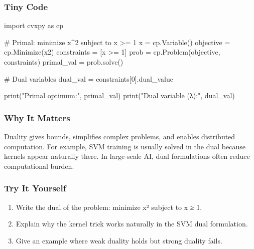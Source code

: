 \documentclass[
  letterpaper,
  DIV=11,
  numbers=noendperiod]{scrreprt}
\newenvironment{Shaded}{\begin{snugshade}}{\end{snugshade}}
\newcommand{\BuiltInTok}[1]{\textcolor[rgb]{0.00,0.23,0.31}{#1}}
\newcommand{\CommentTok}[1]{\textcolor[rgb]{0.37,0.37,0.37}{#1}}
\newcommand{\DecValTok}[1]{\textcolor[rgb]{0.68,0.00,0.00}{#1}}
\newcommand{\ImportTok}[1]{\textcolor[rgb]{0.00,0.46,0.62}{#1}}
\newcommand{\NormalTok}[1]{\textcolor[rgb]{0.00,0.23,0.31}{#1}}
\newcommand{\OperatorTok}[1]{\textcolor[rgb]{0.37,0.37,0.37}{#1}}
\newcommand{\StringTok}[1]{\textcolor[rgb]{0.13,0.47,0.30}{#1}}
\providecommand{\tightlist}{%
  \setlength{\itemsep}{0pt}\setlength{\parskip}{0pt}}
\begin{document}
\subsubsection{Tiny Code}\label{tiny-code-144}

\begin{Shaded}
\begin{Highlighting}[]
\ImportTok{import}\NormalTok{ cvxpy }\ImportTok{as}\NormalTok{ cp}

\CommentTok{\# Primal: minimize x\^{}2 subject to x \textgreater{}= 1}
\NormalTok{x }\OperatorTok{=}\NormalTok{ cp.Variable()}
\NormalTok{objective }\OperatorTok{=}\NormalTok{ cp.Minimize(x2)}
\NormalTok{constraints }\OperatorTok{=}\NormalTok{ [x }\OperatorTok{\textgreater{}=} \DecValTok{1}\NormalTok{]}
\NormalTok{prob }\OperatorTok{=}\NormalTok{ cp.Problem(objective, constraints)}
\NormalTok{primal\_val }\OperatorTok{=}\NormalTok{ prob.solve()}

\CommentTok{\# Dual variables}
\NormalTok{dual\_val }\OperatorTok{=}\NormalTok{ constraints[}\DecValTok{0}\NormalTok{].dual\_value}

\BuiltInTok{print}\NormalTok{(}\StringTok{"Primal optimum:"}\NormalTok{, primal\_val)}
\BuiltInTok{print}\NormalTok{(}\StringTok{"Dual variable (λ):"}\NormalTok{, dual\_val)}
\end{Highlighting}
\end{Shaded}

\subsubsection{Why It Matters}\label{why-it-matters-42}

Duality gives bounds, simplifies complex problems, and enables
distributed computation. For example, SVM training is usually solved in
the dual because kernels appear naturally there. In large-scale AI, dual
formulations often reduce computational burden.

\subsubsection{Try It Yourself}\label{try-it-yourself-144}

\begin{enumerate}
\def\labelenumi{\arabic{enumi}.}
\tightlist
\item
  Write the dual of the problem: minimize x² subject to x ≥ 1.
\item
  Explain why the kernel trick works naturally in the SVM dual
  formulation.
\item
  Give an example where weak duality holds but strong duality fails.
\end{enumerate}
\end{document}
